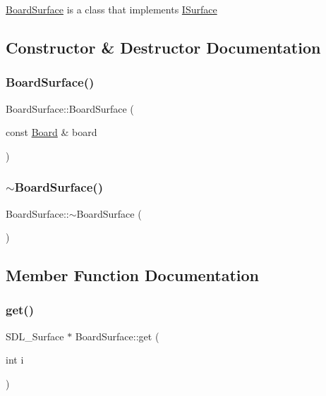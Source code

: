 \mbox{\hyperlink{class_board_surface}{Board\+Surface}} is a class that implements \mbox{\hyperlink{class_i_surface}{I\+Surface}} 

\subsection{Constructor \& Destructor Documentation}
\mbox{\label{class_board_surface_a981d6c6f85322bfb3998512b9a83c5dc}} 
\subsubsection{\texorpdfstring{Board\+Surface()}{BoardSurface()}}
{\footnotesize\ttfamily Board\+Surface\+::\+Board\+Surface (\begin{DoxyParamCaption}\item[{const \mbox{\hyperlink{class_board}{Board}} \&}]{board }\end{DoxyParamCaption})}

\mbox{\label{class_board_surface_a23ded7b4d613c8be63530d2576809eca}} 
\subsubsection{\texorpdfstring{$\sim$\+Board\+Surface()}{~BoardSurface()}}
{\footnotesize\ttfamily Board\+Surface\+::$\sim$\+Board\+Surface (\begin{DoxyParamCaption}{ }\end{DoxyParamCaption})\hspace{0.3cm}{\ttfamily [virtual]}}



\subsection{Member Function Documentation}
\mbox{\label{class_board_surface_a1f70650bc36f591b9a2f44576da4c77c}} 
\subsubsection{\texorpdfstring{get()}{get()}}
{\footnotesize\ttfamily S\+D\+L\+\_\+\+Surface $\ast$ Board\+Surface\+::get (\begin{DoxyParamCaption}\item[{int}]{i }\end{DoxyParamCaption})\hspace{0.3cm}{\ttfamily [virtual]}}



